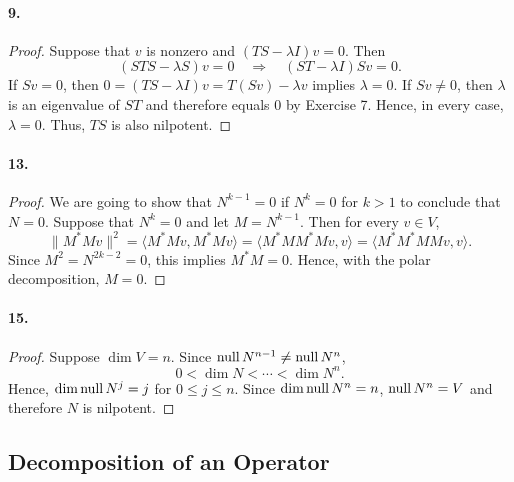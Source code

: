   \paragraph{9.}
  \begin{proof}
    Suppose that $v$ is nonzero and $(TS-\lambda I)v=0$. Then 
    \[
      (STS-\lambda S)v=0 \quad\Rightarrow\quad
      (ST-\lambda I)Sv=0.
    \]
    If $Sv=0$, then $0=(TS-\lambda I)v=T(Sv)-\lambda v$ implies $\lambda=0$. If
    $Sv\ne 0$, then $\lambda$ is an eigenvalue of $ST$ and therefore equals $0$
    by Exercise 7. Hence, in every case, $\lambda=0$. Thus, $TS$ is also 
    nilpotent.
  \end{proof}

  \paragraph{13.}
  \begin{proof}
    We are going to show that $N^{k-1}=0$ if $N^k=0$ for $k>1$ to conclude that 
    $N=0$. Suppose that $N^k=0$ and let $M=N^{k-1}$. Then for every $v\in V$,
    \[
      \|M^*Mv\|^2 = \langle M^*Mv, M^*Mv\rangle
      = \langle M^*MM^*Mv,v\rangle = \langle M^*M^*MMv,v\rangle.
    \]
    Since $M^2=N^{2k-2}=0$, this implies $M^*M=0$. Hence, with the polar 
    decomposition, $M=0$.
  \end{proof}

  \paragraph{15.}
  \begin{proof}
    Suppose $\dim V=n$. Since $\operatorname{null} N^{n-1}\ne\operatorname{null} N^n$,
    \[
      0<\dim N < \cdots < \dim N^n.
    \]
    Hence, $\dim\operatorname{null} N^j=j$ for $0\le j\le n$. Since $\dim\operatorname{null} N^n=n$, $\operatorname{null} N^n
    =V$ and therefore $N$ is nilpotent.
  \end{proof}

\subsection{Decomposition of an Operator}
